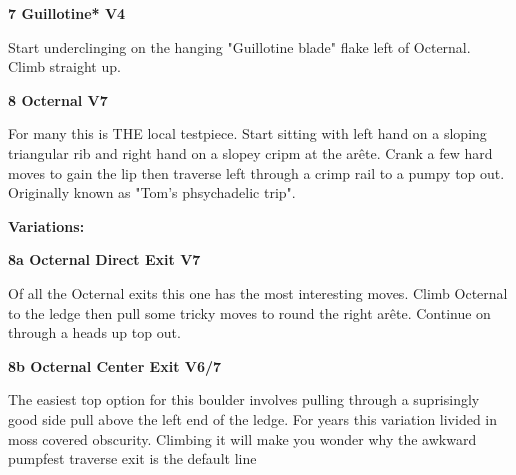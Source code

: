 \begin{multicols}{2}
\begin{adjustwidth}{0.5cm}{}
\end{adjustwidth}


\needspace{1.5cm}
\label{rt:Guillotine}
\colorbox{RoyalBlue!20}{
\parbox{0.95\linewidth}{
\textbf{
7 Guillotine* V4  
}}}

\begin{adjustwidth}{0.5cm}{}			
Start underclinging on the hanging "Guillotine blade" flake left of Octernal. Climb straight up.
\end{adjustwidth}



\needspace{1.5cm}
\label{rt:Octernal}
\colorbox{Goldenrod!50}{
\parbox{0.95\linewidth}{
\textbf{
8 Octernal V7  
}}}

\begin{adjustwidth}{0.5cm}{}			
For many this is THE local testpiece. Start sitting with left hand on a sloping triangular rib and right hand on a slopey cripm at the arête. Crank a few hard moves to gain the lip then traverse left through a crimp rail to a pumpy top out. Originally known as "Tom's phsychadelic trip".
\end{adjustwidth}

\begin{adjustwidth}{0.5cm}{}				
\needspace{3cm}
\textbf{Variations:} \newline

\needspace{1.5cm}
\label{vr:Octernal Direct Exit}
\colorbox{Goldenrod!50}{
\parbox{0.95\linewidth}{
\textbf{
8a Octernal Direct Exit V7  
}}}

\begin{adjustwidth}{0.5cm}{}			
Of all the Octernal exits this one has the most interesting moves. Climb Octernal to the ledge then pull some tricky moves to round the right arête. Continue on through a heads up top out.
\end{adjustwidth}



\needspace{1.5cm}
\label{vr:Octernal Center Exit}
\colorbox{Goldenrod!50}{
\parbox{0.95\linewidth}{
\textbf{
8b Octernal Center Exit V6/7  
}}}

\begin{adjustwidth}{0.5cm}{}			
The easiest top option for this boulder involves pulling through a suprisingly good side pull above the left end of the ledge. For years this variation livided in moss covered obscurity. Climbing it will make you wonder why the awkward pumpfest traverse exit is the default line
\end{adjustwidth}




\end{adjustwidth}
\end{multicols}
